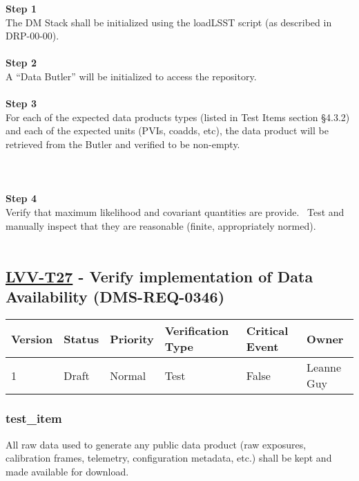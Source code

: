 \textbf{Step 1}\\
The DM Stack shall be initialized using the loadLSST script (as
described in DRP-00-00).\\
~\\
\textbf{Step 2}\\
A ``Data Butler'' will be initialized to access the repository.\\
~\\
\textbf{Step 3}\\
For each of the expected data products types (listed in Test Items
section §4.3.2) and each of the expected units (PVIs, coadds, etc), the
data product will be retrieved from the Butler and verified to be
non-empty.\\
~\\
~\\
~\\
\textbf{Step 4}\\
Verify that maximum likelihood and covariant quantities are provide.
~Test and manually inspect that they are reasonable (finite,
appropriately normed).\\
~\\

\hypertarget{lvv-t27---verify-implementation-of-data-availability-dms-req-0346}{%
\subsection{\texorpdfstring{\href{https://jira.lsstcorp.org/secure/Tests.jspa\#/testCase/LVV-T27}{LVV-T27}
- Verify implementation of Data Availability
(DMS-REQ-0346)}{LVV-T27 - Verify implementation of Data Availability (DMS-REQ-0346)}}\label{lvv-t27---verify-implementation-of-data-availability-dms-req-0346}}

\begin{longtable}[]{@{}llllll@{}}
\toprule
Version & Status & Priority & Verification Type & Critical Event &
Owner\tabularnewline
\midrule
\endhead
1 & Draft & Normal & Test & False & Leanne Guy\tabularnewline
\bottomrule
\end{longtable}

\hypertarget{test_item}{%
\subsubsection{test\_item}\label{test_item}}

All raw data used to generate any public data product (raw exposures,
calibration frames, telemetry, configuration metadata, etc.) shall be
kept and made available for download.

